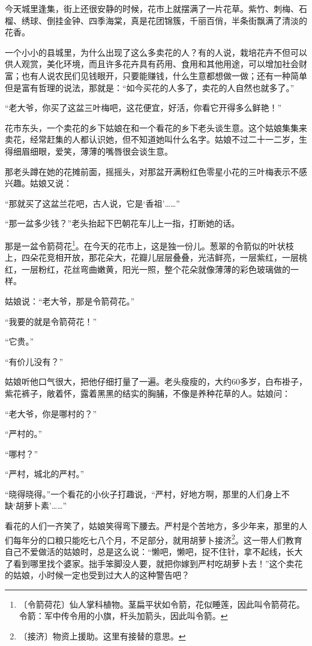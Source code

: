 \documentclass[12pt,UTF-8,openany]{ctexbook}
\begin{document}
\begin{normalsize}
    
    今天城里逢集，街上还很安静的时候，花市上就摆满了一片花草。紫竹、刺梅、石榴、绣球、倒挂金钟、四季海棠，真是花团锦簇，千丽百俏，半条街飘满了清淡的花香。
    
    一个小小的县城里，为什么出现了这么多卖花的人？有的人说，栽培花卉不但可以供人观赏，美化环境，而且许多花卉具有药用、食用和其他用途，可以增加社会财富；也有人说农民们见钱眼开，只要能赚钱，什么生意都想做一做；还有一种简单但是富有哲理的说法，那就是：“如今买花的人多了，卖花的人自然也就多了。”
    
    “老大爷，你买了这盆三叶梅吧，这花便宜，好活，你看它开得多么鲜艳！”
    
    花市东头，一个卖花的乡下姑娘在和一个看花的乡下老头谈生意。这个姑娘集集来卖花，经常赶集的人都认识她，但不知道她叫什么名字。姑娘不过二十一二岁，生得细眉细眼，爱笑，薄薄的嘴唇很会谈生意。
    
    那老头蹲在她的花摊前面，摇摇头，对那盆开满粉红色零星小花的三叶梅表示不感兴趣。姑娘又说：
    
    “那就买了这盆兰花吧，古人说，它是‘香祖’……”
    
    “那一盆多少钱？”老头抬起下巴朝花车儿上一指，打断她的话。
    
    那是一盆令箭荷花\footnote{〔令箭荷花〕仙人掌科植物。茎扁平状如令箭，花似睡莲，因此叫令箭荷花。令箭：军中传令用的小旗，杆头加箭头，因此叫令箭。}。在今天的花市上，这是独一份儿。葱翠的令箭似的叶状枝上，四朵花竞相开放，那花朵大，花瓣儿层层叠叠，光洁鲜亮，一层紫红，一层桃红，一层粉红，花丝弯曲嫩黄，阳光一照，整个花朵就像薄薄的彩色玻璃做的一样。
    
    姑娘说：“老大爷，那是令箭荷花。”
    
    “我要的就是令箭荷花！”
    
    “它贵。”
    
    “有价儿没有？”
    
    姑娘听他口气很大，把他仔细打量了一遍。老头瘦瘦的，大约60多岁，白布褂子，紫花裤子，敞着怀，露着黑黑的结实的胸脯，不像是养种花草的人。姑娘问：
    
    “老大爷，你是哪村的？”
    
    “严村的。”
    
    “哪村？”
    
    “严村，城北的严村。”
    
    “晓得晓得。”一个看花的小伙子打趣说，“严村，好地方啊，那里的人们身上不缺‘胡萝卜素’……”
    
    看花的人们一齐笑了，姑娘笑得弯下腰去。严村是个苦地方，多少年来，那里的人们每年分的口粮只能吃七八个月，不足部分，就用胡萝卜接济\footnote{〔接济〕物资上援助。这里有接替的意思。}。这一带人们教育自己不爱做活的姑娘时，总是这么说：“懒吧，懒吧，捉不住针，拿不起线，长大了看到哪里找个婆家。拙手笨脚没人要，就把你嫁到严村吃胡萝卜去！”这个卖花的姑娘，小时候一定也受到过大人的这种警告吧？
    

\end{normalsize}
\end{document}
